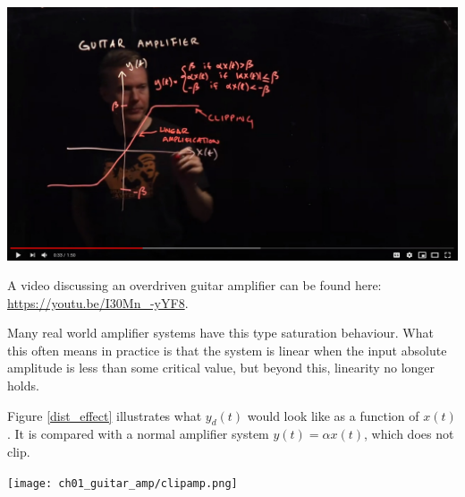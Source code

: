 \begin{marginfigure}
  \begin{center}
    \includegraphics[width=\textwidth]{ch04/figures/ampvid.jpg}
  \end{center}
  \caption{A video discussing an overdriven guitar amplifier can be found here: \url{https://youtu.be/I30Mn_-yYF8}.}
\end{marginfigure}
Many real world amplifier systems have this type saturation behaviour. What this often means in practice is that the system is linear when the input absolute amplitude is less than some critical value, but beyond this, linearity no longer holds.

Figure \ref{dist_effect} illustrates what $y_d(t)$ would look like as a function of $x(t)$. It is compared with a normal amplifier system $y(t)=\alpha x(t)$, which does not clip.

\begin{center}
\texttt{[image: ch01\_guitar\_amp/clipamp.png]}
\end{center}
\fi
